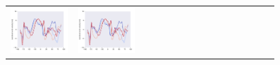 \begin{refsection}
\begin{subappendices}
\begin{tabular}[c]{l|p{0.25\linewidth}|p{0.25\linewidth}|p{0.25\linewidth}|}
				\includegraphics[width=\linewidth, page=7]{psyplot-figures/psy-simple-demo.pdf} &
				\includegraphics[width=\linewidth, page=8]{psyplot-figures/psy-simple-demo.pdf} &

\end{tabular}
\end{subappendices}
\end{refsection}
